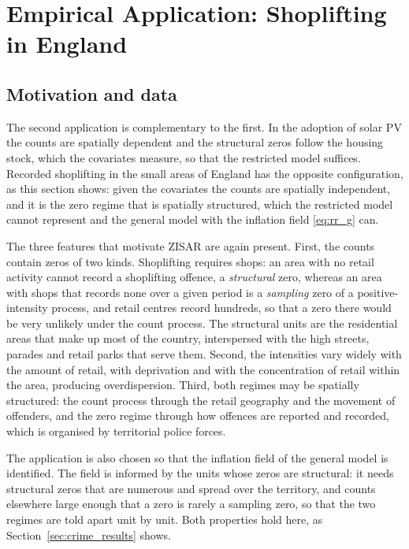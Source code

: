 \section{Empirical Application: Shoplifting in England}\label{sec:crime}

\subsection{Motivation and data}\label{sec:crime_data}

The second application is complementary to the first.
In the adoption of solar PV the counts are spatially dependent and the structural zeros follow the housing stock, which the covariates measure, so that the restricted model suffices.
Recorded shoplifting in the small areas of England has the opposite configuration, as this section shows: given the covariates the counts are spatially independent, and it is the zero regime that is spatially structured, which the restricted model cannot represent and the general model with the inflation field \eqref{eq:rr_g} can.

The three features that motivate ZISAR are again present.
First, the counts contain zeros of two kinds.
Shoplifting requires shops: an area with no retail activity cannot record a shoplifting offence, a \emph{structural} zero, whereas an area with shops that records none over a given period is a \emph{sampling} zero of a positive-intensity process, and retail centres record hundreds, so that a zero there would be very unlikely under the count process.
The structural units are the residential areas that make up most of the country, interspersed with the high streets, parades and retail parks that serve them.
Second, the intensities vary widely with the amount of retail, with deprivation and with the concentration of retail within the area, producing overdispersion.
Third, both regimes may be spatially structured: the count process through the retail geography and the movement of offenders, and the zero regime through how offences are reported and recorded, which is organised by territorial police forces.

The application is also chosen so that the inflation field of the general model is identified.
The field is informed by the units whose zeros are structural: it needs structural zeros that are numerous and spread over the territory, and counts elsewhere large enough that a zero is rarely a sampling zero, so that the two regimes are told apart unit by unit.
Both properties hold here, as Section~\ref{sec:crime_results} shows.

